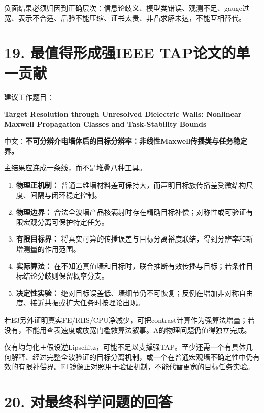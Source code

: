 \documentclass[
  10pt,
  a4paper,
]{article}
\providecommand{\tightlist}{%
  \setlength{\itemsep}{0pt}\setlength{\parskip}{0pt}}
\providecommand{\tightlist}{\setlength{\itemsep}{1pt}\setlength{\parskip}{1pt}}
\begin{document}
负面结果必须归因到正确层次：信息论歧义、模型类错误、观测不足、gauge过宽、表示不合适、后验不能压缩、证书太贵、非凸求解未达，不能互相替代。

\hypertarget{ux6700ux503cux5f97ux5f62ux6210ux5f3aieee-tapux8bbaux6587ux7684ux5355ux4e00ux8d21ux732e}{%
\section{19. 最值得形成强IEEE
TAP论文的单一贡献}\label{ux6700ux503cux5f97ux5f62ux6210ux5f3aieee-tapux8bbaux6587ux7684ux5355ux4e00ux8d21ux732e}}

建议工作题目：

\textbf{Target Resolution through Unresolved Dielectric Walls: Nonlinear
Maxwell Propagation Classes and Task-Stability Bounds}

中文：\textbf{不可分辨介电墙体后的目标分辨率：非线性Maxwell传播类与任务稳定界。}

主结果应连成一条线，而不是堆叠八种工具。

\begin{enumerate}
\def\labelenumi{\arabic{enumi}.}
\tightlist
\item
  \textbf{物理正机制：}
  普通二维墙材料差可保持大，而声明目标族传播差受微结构尺度、间隔与闭环稳定控制。
\item
  \textbf{物理边界：}
  合法全波墙产品核满射时存在精确目标补偿；对称性或可验证有限宏观分离可保护特定任务。
\item
  \textbf{有限目标界：}
  将真实可算的传播误差与目标分离裕度联结，得到分辨率和新增测量的作用范围。
\item
  \textbf{实际算法：}
  在不知道真值墙和目标时，联合推断有效传播与目标；若条件目标结论分歧则保留概率分支。
\item
  \textbf{决定性实验：}
  绝对目标误差低、墙细节仍不可恢复；反例在增加非对称自由度、接近共振或扩大任务时按理论出现。
\end{enumerate}

若E3另外证明真实FE/RHS/CPU净减少，可把contrast计算作为强算法增量；若没有，不能用查表速度或放宽门槛救算法叙事。A的物理问题仍值得独立完成。

仅有均匀化＋假设逆Lipschitz，可能不足以支撑强TAP。至少还需一个有具体几何解释、经过完整全波验证的目标分离机制，或一个在普通宏观墙不确定性中仍有效的有限补偿界。E1镜像正对照用于验证机制，不能代替更宽的目标任务实验。

\hypertarget{ux5bf9ux6700ux7ec8ux79d1ux5b66ux95eeux9898ux7684ux56deux7b54}{%
\section{20.
对最终科学问题的回答}\label{ux5bf9ux6700ux7ec8ux79d1ux5b66ux95eeux9898ux7684ux56deux7b54}}
\end{document}
